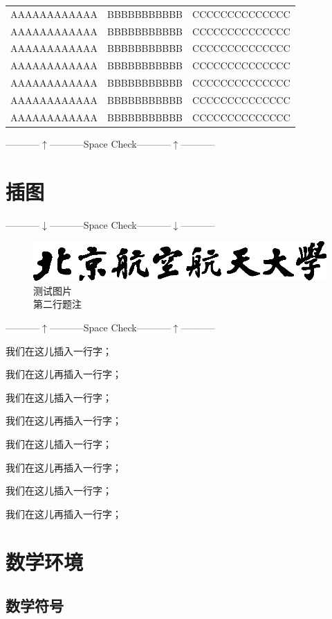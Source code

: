 \begin{longtable}[h]{ccc}
  AAAAAAAAAAAA   &   BBBBBBBBBBB   &   CCCCCCCCCCCCCC   \\
  AAAAAAAAAAAA   &   BBBBBBBBBBB   &   CCCCCCCCCCCCCC   \\
  AAAAAAAAAAAA   &   BBBBBBBBBBB   &   CCCCCCCCCCCCCC   \\
  AAAAAAAAAAAA   &   BBBBBBBBBBB   &   CCCCCCCCCCCCCC   \\
  AAAAAAAAAAAA   &   BBBBBBBBBBB   &   CCCCCCCCCCCCCC   \\
  AAAAAAAAAAAA   &   BBBBBBBBBBB   &   CCCCCCCCCCCCCC   \\
  AAAAAAAAAAAA   &   BBBBBBBBBBB   &   CCCCCCCCCCCCCC   \\
\end{longtable}

\centerline{-----------$\uparrow$-----------Space Check-----------$\uparrow$-----------}


\section{插图}

\centerline{-----------$\downarrow$-----------Space Check-----------$\downarrow$-----------}
\begin{figure}[!h]
  \centering
  \includegraphics[width=.5\textwidth]{logo-buaa}
  \caption{测试图片\\第二行题注}
  \label{fig:logo}
\end{figure}
\centerline{-----------$\uparrow$-----------Space Check-----------$\uparrow$-----------}

我们在这儿插入一行字；

我们在这儿再插入一行字；

我们在这儿插入一行字；

我们在这儿再插入一行字；

我们在这儿插入一行字；

我们在这儿再插入一行字；

我们在这儿插入一行字；

我们在这儿再插入一行字；

\section{数学环境}

\subsection{数学符号}

